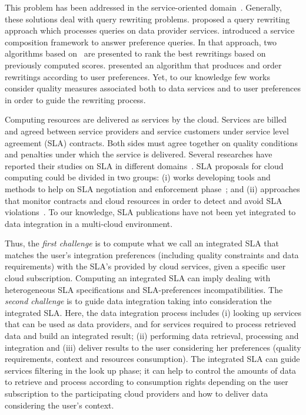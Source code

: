This problem has been addressed in the service-oriented
domain~\cite{Barhamgi2010,Benouaret2011,ba2014}.
Generally, these solutions deal with query rewriting problems.
\cite{Barhamgi2010} proposed a query rewriting approach which processes queries
on data provider services. \cite{Benouaret2011} introduced a service composition
framework to answer preference queries. In that approach, two algorithms based
on~\cite{Barhamgi2010} are presented to rank the best rewritings based on previously computed scores.
\cite{ba2014} presented an algorithm that produces and order rewritings
according to user preferences. Yet, to our knowledge few works consider quality
measures associated both to data services and to user preferences in order to
guide the rewriting process. 

Computing resources are delivered as services by the cloud. Services are billed and agreed between service providers and service customers under service level agreement (SLA) contracts.
Both sides must agree together on quality conditions and penalties under which the service is delivered. 
Several researches have reported their studies on SLA in different domains~\cite{AlhamadDC11}.
SLA proposals for cloud computing could be divided in two groups: (i) works
developing tools and methods to help on SLA negotiation and enforcement
phase~\cite{rak2013,Mavrogeorgi2013}; and (ii) approaches that monitor contracts
and cloud resources in order to detect and avoid SLA
violations~\cite{Leitner2010,Maarouf2015}. To our knowledge, SLA publications
have not been yet integrated to data integration in a multi-cloud environment.

Thus, the \textit{first challenge} is to compute what we call an integrated SLA
that matches the user's integration preferences (including quality constraints
and data requirements) with the SLA's provided by cloud services, given a
specific user cloud subscription. Computing an integrated SLA can imply dealing
with heterogeneous SLA specifications and SLA-preferences incompatibilities.
The \textit{second challenge} is to guide data integration taking into
consideration the integrated SLA. Here, the data integration process includes (i) looking up services that can be used as data providers, and for services required to process retrieved data and build an
integrated result; (ii) performing data retrieval, processing and integration
and (iii) deliver results to the user considering her preferences (quality
requirements, context and resources consumption). The integrated SLA can guide
services filtering in the look up phase; it can help to control the amounts of
data to retrieve and process according to consumption rights depending on the
user subscription to the participating cloud providers and how to deliver data
considering the user's context.          


